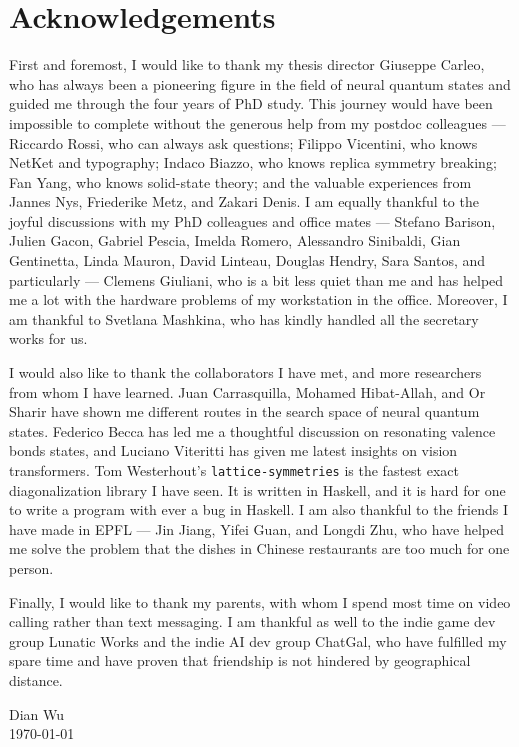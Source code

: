 \chapter*{Acknowledgements}

First and foremost, I would like to thank my thesis director Giuseppe Carleo, who has always been a pioneering figure in the field of neural quantum states and guided me through the four years of PhD study.
This journey would have been impossible to complete without the generous help from my postdoc colleagues --- Riccardo Rossi, who can always ask questions; Filippo Vicentini, who knows NetKet and typography; Indaco Biazzo, who knows replica symmetry breaking; Fan Yang, who knows solid-state theory; and the valuable experiences from Jannes Nys, Friederike Metz, and Zakari Denis.
I am equally thankful to the joyful discussions with my PhD colleagues and office mates --- Stefano Barison, Julien Gacon, Gabriel Pescia, Imelda Romero, Alessandro Sinibaldi, Gian Gentinetta, Linda Mauron, David Linteau, Douglas Hendry, Sara Santos, and particularly --- Clemens Giuliani, who is a bit less quiet than me and has helped me a lot with the hardware problems of my workstation in the office.
Moreover, I am thankful to Svetlana Mashkina, who has kindly handled all the secretary works for us.

I would also like to thank the collaborators I have met, and more researchers from whom I have learned.
Juan Carrasquilla, Mohamed Hibat-Allah, and Or Sharir have shown me different routes in the search space of neural quantum states.
Federico Becca has led me a thoughtful discussion on resonating valence bonds states, and Luciano Viteritti has given me latest insights on vision transformers.
Tom Westerhout's \texttt{lattice-symmetries} is the fastest exact diagonalization library I have seen. It is written in Haskell, and it is hard for one to write a program with ever a bug in Haskell.
I am also thankful to the friends I have made in EPFL --- Jin Jiang, Yifei Guan, and Longdi Zhu, who have helped me solve the problem that the dishes in Chinese restaurants are too much for one person.

Finally, I would like to thank my parents, with whom I spend most time on video calling rather than text messaging.
I am thankful as well to the indie game dev group Lunatic Works and the indie AI dev group ChatGal, who have fulfilled my spare time and have proven that friendship is not hindered by geographical distance.

\begin{flushright}
Dian Wu \\
\today
\end{flushright}
